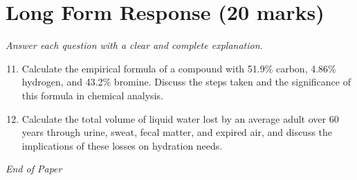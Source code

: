 \documentclass[12pt]{article}
\begin{document}
\section*{Long Form Response (20 marks)}
\textit{Answer each question with a clear and complete explanation.}
\begin{enumerate}[label=\arabic*.]
\setcounter{enumi}{10}
\item Calculate the empirical formula of a compound with 51.9\% carbon, 4.86\% hydrogen, and 43.2\% bromine. Discuss the steps taken and the significance of this formula in chemical analysis.
\item Calculate the total volume of liquid water lost by an average adult over 60 years through urine, sweat, fecal matter, and expired air, and discuss the implications of these losses on hydration needs.
\end{enumerate}

\vfill
\noindent\textit{End of Paper}
\end{document}
